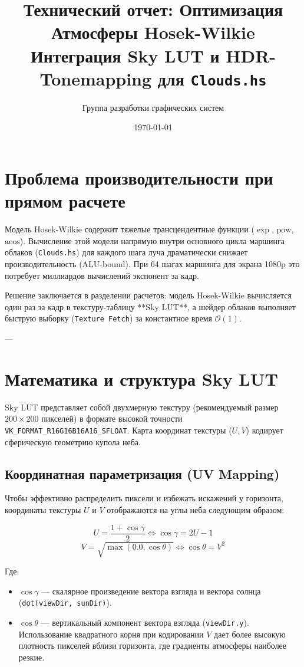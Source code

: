 \documentclass[11pt,a4paper]{article}
\title{Технический отчет: Оптимизация Атмосферы Hosek-Wilkie \\ \large Интеграция Sky LUT и HDR-Tonemapping для \texttt{Clouds.hs}}
\author{Группа разработки графических систем}
\date{\today}
\begin{document}
\maketitle

\section{Проблема производительности при прямом расчете}
Модель Hosek-Wilkie содержит тяжелые трансцендентные функции ($\exp$, $\text{pow}$, $\text{acos}$). Вычисление этой модели напрямую внутри основного цикла маршинга облаков (\texttt{Clouds.hs}) для каждого шага луча драматически снижает производительность (ALU-bound). При 64 шагах маршинга для экрана 1080p это потребует миллиардов вычислений экспонент за кадр.

Решение заключается в разделении расчетов: модель Hosek-Wilkie вычисляется один раз за кадр в текстуру-таблицу **Sky LUT**, а шейдер облаков выполняет быструю выборку (\texttt{Texture Fetch}) за константное время $\mathcal{O}(1)$.

---

\section{Математика и структура Sky LUT}
Sky LUT представляет собой двухмерную текстуру (рекомендуемый размер $200 \times 200$ пикселей) в формате высокой точности \texttt{VK\_FORMAT\_R16G16B16A16\_SFLOAT}. Карта координат текстуры ($U, V$) кодирует сферическую геометрию купола неба.

\subsection{Координатная параметризация (UV Mapping)}
Чтобы эффективно распределить пиксели и избежать искажений у горизонта, координаты текстуры $U$ и $V$ отображаются на углы неба следующим образом:

\begin{equation}
    U = \frac{1 + \cos\gamma}{2} \iff \cos\gamma = 2U - 1
\end{equation}
\begin{equation}
    V = \sqrt{\max(0.0, \cos\theta)} \iff \cos\theta = V^2
\end{equation}

Где:
\begin{itemize}
    \item $\cos\gamma$ --- скалярное произведение вектора взгляда и вектора солнца (\texttt{dot(viewDir, sunDir)}).
    \item $\cos\theta$ --- вертикальный компонент вектора взгляда (\texttt{viewDir.y}). Использование квадратного корня при кодировании $V$ дает более высокую плотность пикселей вблизи горизонта, где градиенты атмосферы наиболее резкие.
\end{itemize}
\end{document}
